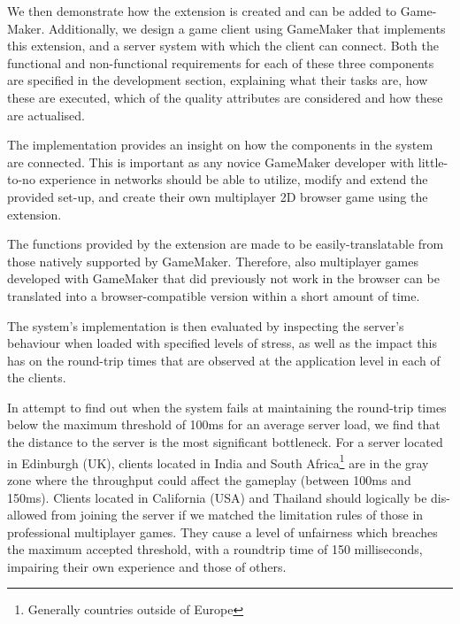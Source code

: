 \documentclass[bsc, 12pt, twoside, singlespacing, parskip, abbrevs, notimes, normalheadings, logo]{styles/infthesis}
\begin{document}
\vspace{1em}
We then demonstrate how the extension is created and can be added to Game-Maker. Additionally, we design a game client using GameMaker that implements this extension, and a server system with which the client can connect. Both the functional and non-functional requirements for each of these three components are specified in the development section, explaining what their tasks are, how these are executed, which of the quality attributes are considered and how these are actualised.

\vspace{1em}
The implementation provides an insight on how the components in the system are connected. This is important as any novice GameMaker developer with little-to-no experience in networks should be able to utilize, modify and extend the provided set-up, and create their own multiplayer 2D browser game using the extension.

\vspace{1em}
The functions provided by the extension are made to be easily-translatable from those natively supported by GameMaker. Therefore, also multiplayer games developed with GameMaker that did previously not work in the browser can be translated into a browser-compatible version within a short amount of time.

\vspace{1em}
The system's implementation is then evaluated by inspecting the server's behaviour when loaded with specified levels of stress, as well as the impact this has on the round-trip times that are observed at the application level in each of the clients.

\vspace{1em}
In attempt to find out when the system fails at maintaining the round-trip times below the maximum threshold of 100ms for an average server load, we find that the distance to the server is the most significant bottleneck. For a server located in Edinburgh (UK), clients located in India and South Africa\footnote{Generally countries outside of Europe} are in the gray zone where the throughput could affect the gameplay (between 100ms and 150ms). Clients located in California (USA) and Thailand should logically be dis-allowed from joining the server if we matched the limitation rules of those in professional multiplayer games. They cause a level of unfairness which breaches the maximum accepted threshold, with a roundtrip time of 150 milliseconds, impairing their own experience and those of others.
\end{document}
